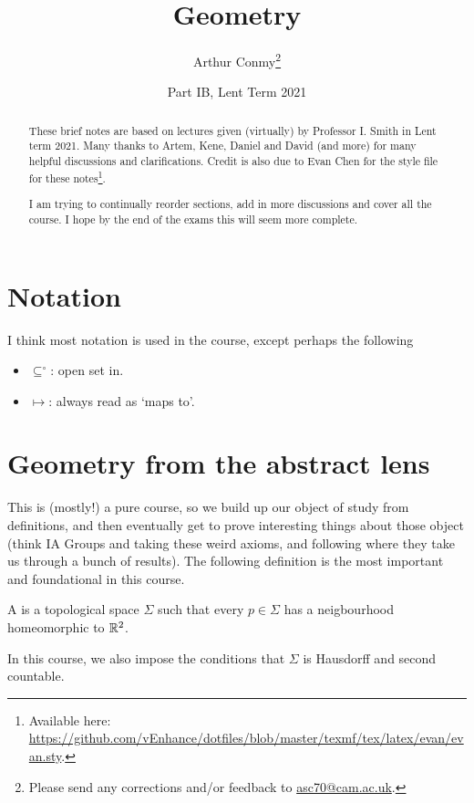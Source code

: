 \documentclass[11pt]{scrartcl}
\begin{document}
\title{Geometry}
\author{Arthur Conmy\footnote{Please send any corrections and/or feedback to \url{asc70@cam.ac.uk}.}}
\date{Part IB, Lent Term 2021}

\maketitle
\begin{abstract}
These brief notes are based on lectures given (virtually) by Professor I. Smith in Lent term 2021. 
Many thanks to Artem, Kene, Daniel and David (and more) for many helpful discussions and clarifications.
Credit is also due to Evan Chen for the style file for these notes\footnote{Available here: \url{https://github.com/vEnhance/dotfiles/blob/master/texmf/tex/latex/evan/evan.sty}.}.

I am trying to continually reorder sections, add in more discussions and cover all the course. I hope by the end of the exams this will seem more complete.
\end{abstract}

\tableofcontents %

\section{Notation}

I think most notation is used in the course, except perhaps the following

\begin{itemize}
    \item $\subseteq^\circ$: open set in.
    \item $\mapsto$: always read as `maps to'.
\end{itemize}

\section{Geometry from the abstract lens}

This is (mostly!) a pure course, so we build up our object of study from definitions, and then eventually get to prove interesting things about those object (think IA Groups and taking these weird axioms, and following where they take us through a bunch of results). The following definition is the most important and foundational in this course.

\begin{definition}
[Surface]
\label{surface definition}
A  is a topological space $\Sigma$ such that every $p \in \Sigma$ has a neigbourhood homeomorphic to $\mathbb R^2$.

In this course, we also impose the conditions that $\Sigma$ is Hausdorff and second countable.
\end{definition}
\end{document}
